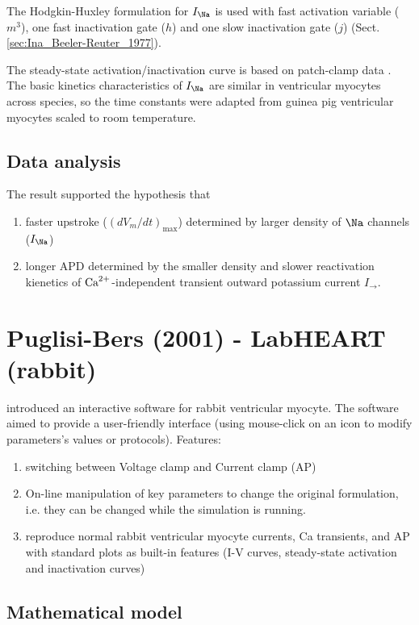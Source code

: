 The Hodgkin-Huxley formulation for $I_\Na$ is used with fast activation variable
($m^3$), one fast inactivation gate ($h$) and one slow inactivation gate ($j$)
(Sect.\ref{sec:Ina_Beeler-Reuter_1977}).

The steady-state activation/inactivation curve is based on patch-clamp
data \citep{lee1999}. The basic kinetics characteristics of $I_\Na$ are similar
in ventricular myocytes across species, so the time constants were adapted from guinea pig
ventricular myocytes \citep{luo1994dmc_a} scaled to room temperature.




\subsection{Data analysis}

The result supported the hypothesis that
\begin{enumerate}
  \item faster upstroke ($(dV_m/dt)_\max$) determined by larger density of
  $\Na$ channels ($I_\Na$)
  \item longer APD determined by the smaller density and slower reactivation
  kienetics of ${\text{Ca}^{2+}}$-independent transient outward potassium current $I_\to$.
\end{enumerate}

\section{Puglisi-Bers (2001) - LabHEART (rabbit)}

\citep{puglisi2001} introduced an interactive software for rabbit ventricular
myocyte. The software aimed to provide a user-friendly interface (using
mouse-click on an icon to modify parameters's values or protocols). Features:
\begin{enumerate}
  \item switching between Voltage clamp and Current clamp (AP)
  \item On-line manipulation of key parameters to change the original
  formulation, i.e. they can be changed while the simulation is running.
  \item reproduce normal rabbit ventricular myocyte currents, Ca transients, and
  AP with standard plots as built-in features (I-V curves, steady-state
  activation and inactivation curves)
\end{enumerate}

\subsection{Mathematical model}

